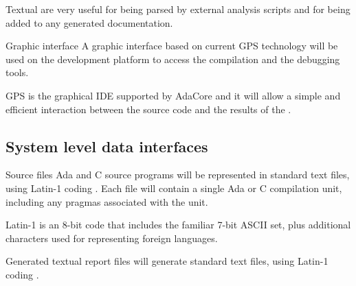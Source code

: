 \begin{rationale}
  Textual are very useful for being parsed by external analysis
  scripts and for being added to any generated documentation.
\end{rationale}

\begin{requirement}{Graphic interface}
  A graphic interface based on current GPS technology will be used on
  the development platform to access the compilation and the debugging
  tools.
\end{requirement}

\begin{rationale}
  GPS is the graphical IDE supported by AdaCore and it will allow a
  simple and efficient interaction between the source code and the
  results of the \ssat{}.
\end{rationale}

\subsection{System level data interfaces}\label{sc:data-interfaces}

\begin{requirement}{Source files}
  Ada and C source programs will be represented in standard text files,
  using Latin-1 coding . Each file will contain a single
  Ada or C compilation unit, including any pragmas associated with the
  unit.
\end{requirement}

\begin{rationale}
  Latin-1 is an 8-bit code that includes the familiar 7-bit ASCII set,
  plus additional characters used for representing foreign languages.
\end{rationale}

\begin{requirement}{Generated textual report files}
  \ssat{} will generate standard text files, using Latin-1 coding
  .
\end{requirement}


